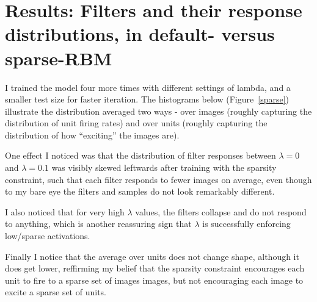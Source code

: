 \documentclass[12pt]{article}
\begin{document}
\section*{Results: Filters and their response distributions, in default- versus sparse-RBM}

I trained the model four more times with different settings of lambda, and a smaller test size for faster iteration. The histograms below (Figure~\ref{sparse}) illustrate the distribution averaged two ways - over images (roughly capturing the distribution of unit firing rates) and over units (roughly capturing the distribution of how ``exciting'' the images are). 

One effect I noticed was that the distribution of filter responses between $\lambda=0$ and $\lambda=0.1$ was visibly skewed leftwards after training with the sparsity constraint, such that each filter responds to fewer images on average, even though to my bare eye the filters and samples do not look remarkably different.

I also noticed that for very high $\lambda$ values, the filters collapse and do not respond to anything, which is another reassuring sign that $\lambda$ is successfully enforcing low/sparse activations.

Finally I notice that the average over units does not change shape, although it does get lower, reffirming my belief that the sparsity constraint encourages each unit to fire to a sparse set of images images, but not encouraging each image to excite a sparse set of units.
\end{document}
